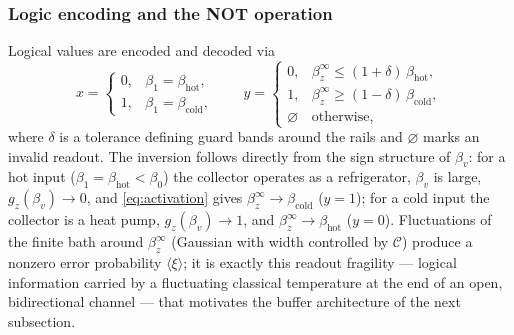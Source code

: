 \documentclass[11pt,a4paper]{article}
\theoremstyle{definition}
\theoremstyle{remark}
\begin{document}
\subsubsection{Logic encoding and the NOT operation}
\label{sec:logic}
Logical values are encoded and decoded via
\begin{equation}
x = \begin{cases}
0, & \beta_1 = \beta_{\mathrm{hot}},\\
1, & \beta_1 = \beta_{\mathrm{cold}},
\end{cases}
\qquad
y = \begin{cases}
0, & \beta_z^{\infty} \le (1+\delta)\,\beta_{\mathrm{hot}},\\
1, & \beta_z^{\infty} \ge (1-\delta)\,\beta_{\mathrm{cold}},\\
\varnothing & \text{otherwise},
\end{cases}
\label{eq:encoding}
\end{equation}
where $\delta$ is a tolerance defining guard bands around the rails and
$\varnothing$ marks an invalid readout. The inversion follows directly
from the sign structure of $\beta_v$: for a hot input
($\beta_1=\beta_{\mathrm{hot}}<\beta_0$) the collector operates as a
refrigerator, $\beta_v$ is large, $g_z(\beta_v)\to 0$, and
\eqref{eq:activation} gives $\beta_z^\infty\to\beta_{\mathrm{cold}}$
($y=1$); for a cold input the collector is a heat pump,
$g_z(\beta_v)\to 1$, and $\beta_z^\infty\to\beta_{\mathrm{hot}}$
($y=0$). Fluctuations of the finite bath around $\beta_z^\infty$
(Gaussian with width controlled by $\mathcal{C}$) produce a nonzero
error probability $\langle\xi\rangle$; it is exactly this readout
fragility --- logical information carried by a fluctuating classical
temperature at the end of an open, bidirectional channel --- that
motivates the buffer architecture of the next subsection.
 
\end{document}
